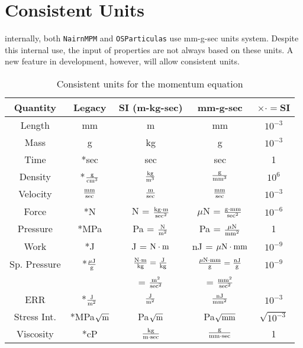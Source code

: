 \documentclass[11pt]{article}
\begin{document}
\section{Consistent Units}

internally, both {\tt NairnMPM} and {\tt OSParticulas} use mm-g-sec units system. Despite this internal use, the input of properties are not always based on these units. A new feature in development, however, will allow consistent units.

\begin{table}
\caption{Consistent units for the momentum equation}
\begin{center}
\renewcommand{\arraystretch}{1.3}
\begin{tabular}{||c||c||c||c|c||}
\hline
Quantity & Legacy & SI (m-kg-sec) & mm-g-sec & $\times\cdot=$SI \\
\hline
Length & mm & m & mm & $10^{-3}$ \\
Mass & g & kg & g & $10^{-3}$ \\
Time & *sec & sec & sec & 1 \\
Density & *$\rm g\over cm^3$ & $\rm kg\over m^3$ & $\rm g\over mm^3$ & $10^{6}$ \\
Velocity & $\rm mm\over sec$& $\rm m\over sec$ & $\rm mm\over sec$ & $10^{-3}$ \\
Force & *N & N = $\rm kg\cdot m\over sec^2$  & $\mu$N = $\rm g \cdot mm\over sec^2$  & $10^{-6}$ \\
Pressure & *MPa & Pa = $\rm N\over m^2$ & Pa = $\mu \rm N\over mm^2$ & 1 \\
Work & *J & J = $\rm N\cdot m$  & nJ = $\mu \rm N \cdot mm$ & $10^{-9}$ \\
Sp. Pressure & *$\rm \mu J \over g$ & $\rm {N\cdot m\over kg} = {J \over kg}$ & $\rm{\mu N\cdot mm\over g} = {nJ \over g}$  & $10^{-9}$\\
 & &  = $\rm m^2\over sec^2$ & = $\rm mm^2 \over sec^2$ & \\
ERR & *$\rm J \over m^2$ & $\rm J \over m^2$ & $\rm nJ\over mm^2$ & $10^{-3}$ \\
Stress Int. & *MPa$\sqrt{\rm m}$ & Pa$\sqrt{\rm m}$ & Pa$\sqrt{\rm mm}$ & $\sqrt{10^{-3}}$ \\
Viscosity & *cP & $\rm kg\over m\cdot sec$ & $\rm g\over mm\cdot sec$ & 1 \\
\hline
\end{tabular}
\end{center}
\label{units}
\end{table}
\end{document}
